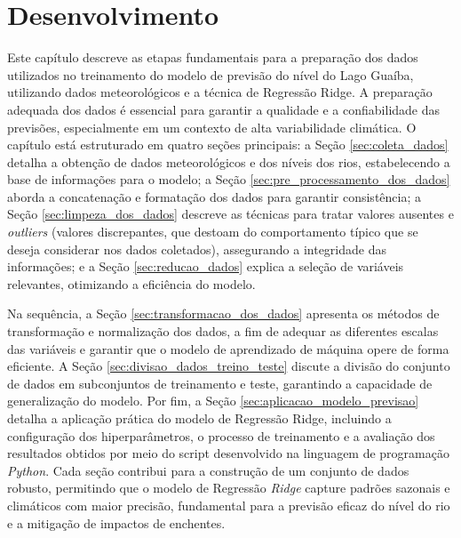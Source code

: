 \chapter{Desenvolvimento}
\label{cap:desenvolvimento}

Este capítulo descreve as etapas fundamentais para a preparação dos dados utilizados no treinamento do modelo de previsão do nível do Lago Guaíba, utilizando dados meteorológicos e a técnica de Regressão Ridge. A preparação adequada dos dados é essencial para garantir a qualidade e a confiabilidade das previsões, especialmente em um contexto de alta variabilidade climática. O capítulo está estruturado em quatro seções principais: a Seção \ref{sec:coleta_dados} detalha a obtenção de dados meteorológicos e dos níveis dos rios, estabelecendo a base de informações para o modelo; a Seção \ref{sec:pre_processamento_dos_dados} aborda a concatenação e formatação dos dados para garantir consistência; a Seção \ref{sec:limpeza_dos_dados} descreve as técnicas para tratar valores ausentes e \textit{outliers} (valores discrepantes, que destoam do comportamento típico que se deseja considerar nos dados coletados), assegurando a integridade das informações; e a Seção \ref{sec:reducao_dados} explica a seleção de variáveis relevantes, otimizando a eficiência do modelo. 

Na sequência, a Seção \ref{sec:transformacao_dos_dados} apresenta os métodos de transformação e normalização dos dados, a fim de adequar as diferentes escalas das variáveis e garantir que o modelo de aprendizado de máquina opere de forma eficiente. A Seção \ref{sec:divisao_dados_treino_teste} discute a divisão do conjunto de dados em subconjuntos de treinamento e teste, garantindo a capacidade de generalização do modelo. Por fim, a Seção \ref{sec:aplicacao_modelo_previsao} detalha a aplicação prática do modelo de Regressão Ridge, incluindo a configuração dos hiperparâmetros, o processo de treinamento e a avaliação dos resultados obtidos por meio do script desenvolvido na linguagem de programação \textit{Python}. Cada seção contribui para a construção de um conjunto de dados robusto, permitindo que o modelo de Regressão \textit{Ridge} capture padrões sazonais e climáticos com maior precisão, fundamental para a previsão eficaz do nível do rio e a mitigação de impactos de enchentes.


